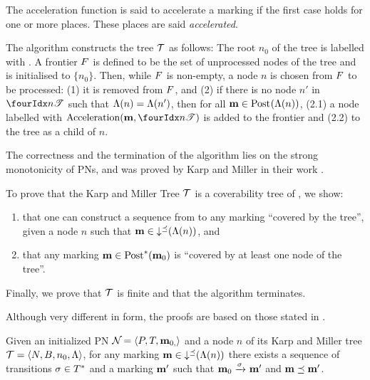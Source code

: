 The acceleration function is said to accelerate a marking if the first case holds for one or more places.
These places are said \emph{accelerated}.


The algorithm constructs the tree $\mathcal{T}$ as follows:
The root $n_0$ of the tree is labelled with \mari.
A frontier $F$ is defined to be the set of unprocessed nodes of the tree and is initialised to $\{n_0\}$.
Then, while $F$ is non-empty, a node $n$ is chosen from $F$ to be processed:
(1) it is removed from $F$, and (2) if there is no node $n'$ in $\treepath{n}$ such that $\operatorname{\Lambda}(n) = \operatorname{\Lambda}(n')$, then for all \omark $\mathbf{m} \in \operatorname{Post}_{}(\operatorname{\Lambda}(n))$, (2.1) a node labelled with $\kmacc{\mar, \treepath{n}}$ is added to the frontier and (2.2) to the tree as a child of $n$.

The correctness and the termination of the algorithm lies on the strong monotonicity of \acp{PN}, and was proved by Karp and Miller in their work \cite{Karp69}.

To prove that the Karp and Miller Tree $\mathcal{T}$ is a coverability tree of \namePN, we show:
\begin{enumerate}
  \item \todo{} that one can construct a sequence from \mari to any marking \mar “covered by the tree”, given a node $n$ such that $\mathbf{m} \in \operatorname{\downarrow^\preceq}(\operatorname{\Lambda}(n))$, and
  \item \todo{} that any marking $\mathbf{m} \in \operatorname{Post}^*_{}(\mathbf{m}_0)$ is “covered by at least one node of the tree”.
\end{enumerate}

\todo{} Finally, we prove that $\mathcal{T}$ is finite and that the algorithm terminates.

Although very different in form, the proofs are based on those stated in \cite{Karp69}.

\begin{lemm}
  Given an initialized \ac{PN} $\mathcal{N}_{} = \left\langle P_{}, T_{}, \mathbf{m}_{0,}\right\rangle$ and a node $n$ of its Karp and Miller tree $\mathcal{T} = \left\langle N, B, n_0, \operatorname{\Lambda}\right\rangle$,
  for any marking $\mathbf{m} \in \operatorname{\downarrow^\preceq}(\operatorname{\Lambda}(n))$ there exists a sequence of transitions $\seqt \in \transitions^*$ and a marking $\mathbf{m}'$ such that $\mari \fire{\seqt} \mar'$ and $\mathbf{m} \preceq \mathbf{m}'$.
\end{lemm}

